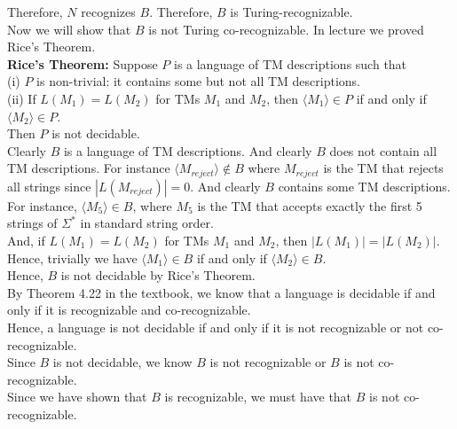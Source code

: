 \documentclass[12pt]{article}
\begin{document}
Therefore, $N$ recognizes $B$. Therefore, $B$ is Turing-recognizable. \\

Now we will show that $B$ is not Turing co-recognizable. In lecture we proved Rice's Theorem. \\

\textbf{Rice's Theorem:} Suppose $P$ is a language of TM descriptions such that \\

(i) $P$ is non-trivial: it contains some but not all TM descriptions. \\

(ii) If $L(M_1) = L(M_2)$ for TMs $M_1$ and $M_2$, then $\langle M_1 \rangle \in P$ if and only if $\langle M_2 \rangle \in P$. \\

Then $P$ is not decidable. \\

Clearly $B$ is a language of TM descriptions. And clearly $B$ does not contain all TM descriptions. For instance $\langle M_{reject} \rangle \not \in B$ where $M_{reject}$ is the TM that rejects all strings since $|L(M_{reject})| = 0$. And clearly $B$ contains some TM descriptions. For instance, $\langle M_5 \rangle \in B$, where $M_5$ is the TM that accepts exactly the first 5 strings of $\Sigma^*$ in standard string order. \\

And, if $L(M_1) = L(M_2)$ for TMs $M_1$ and $M_2$, then $|L(M_1)| = |L(M_2)|$. Hence, trivially we have $\langle M_1 \rangle \in B$ if and only if $\langle M_2 \rangle \in B$. \\

Hence, $B$ is not decidable by Rice's Theorem. \\

By Theorem 4.22 in the textbook, we know that a language is decidable if and only if it is recognizable and co-recognizable. \\

Hence, a language is not decidable if and only if it is not recognizable or not co-recognizable. \\

Since $B$ is not decidable, we know $B$ is not recognizable or $B$ is not co-recognizable. \\

Since we have shown that $B$ is recognizable, we must have that $B$ is not co-recognizable. \\
\end{document}
